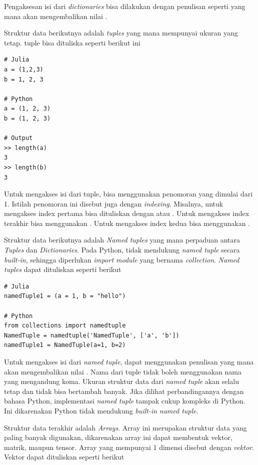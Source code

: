 \noindent
Pengaksesan isi dari \emph{dictionaries} bisa dilakukan dengan penulisan seperti
 yang mana akan mengembalikan nilai .

Struktur data berikutnya adalah \emph{tuples} yang mana mempunyai ukuran yang
tetap. tuple bisa dituliska seperti berikut ini

\begin{lstlisting}
# Julia
a = (1,2,3)
b = 1, 2, 3

# Python
a = (1, 2, 3)
b = (1, 2, 3)

# Output
>> length(a)
3
>> length(b)
3
\end{lstlisting}

\noindent
Untuk mengakses isi dari tuple, bisa menggunakan penomoran yang dimulai dari 1. Istilah
penomoran ini disebut juga dengan \emph{indexing}. Misalnya, untuk mengakses
index pertama bisa dituliskan dengan  atau . Untuk mengakses
index terakhir bisa menggunakan . Untuk mengakses index kedua bisa menggunakan
.

Struktur data berikutnya adalah \emph{Named tuples} yang mana perpaduan antara
\emph{Tuples} dan \emph{Dictionaries}. Pada Python, tidak mendukung \emph{named
	tuple} secara \emph{built-in}, sehingga diperlukan \emph{import module} yang
bernama \emph{collection}. \emph{Named tuples} dapat dituliskan seperti berikut

\begin{lstlisting}
# Julia
namedTuple1 = (a = 1, b = "hello")

# Python
from collections import namedtuple
NamedTuple = namedtuple('NamedTuple', ['a', 'b'])
namedTuple1 = NamedTuple(a=1, b=2)
\end{lstlisting}

\noindent
Untuk mengakses isi dari \emph{named tuple}, dapat menggunakan penulisan 
yang mana akan mengembalikan nilai . Nama dari tuple tidak boleh
menggunakan nama yang mengandung koma. Ukuran struktur data dari \emph{named
	tuple} akan selalu tetap dan tidak bisa bertambah banyak. Jika dilihat perbandingannya
dengan bahasa Python, implementasi \emph{named tuple} tampak cukup kompleks di Python.
Ini dikarenakan Python tidak mendukung \emph{built-in} \emph{named tuple}.

Struktur data terakhir adalah \emph{Arrays}. Array ini merupakan struktur data
yang paling banyak digunakan, dikarenakan array ini dapat membentuk vektor,
matrik, maupun tensor. Array yang mempunyai 1 dimensi disebut dengan
\emph{vektor}. Vektor dapat dituliskan seperti berikut

